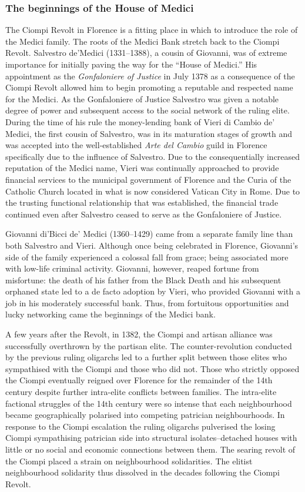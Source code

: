 \subsubsection{The beginnings of the House of Medici}

The Ciompi Revolt in Florence is a fitting place in which to introduce the role of the Medici family. The roots of the Medici Bank stretch back to the Ciompi Revolt. Salvestro de'Medici (1331--1388), a cousin of Giovanni, was of extreme importance for initially paving the way for the ``House of Medici.'' His appointment as the \emph{Gonfaloniere of Justice} in July 1378 as a consequence of the Ciompi Revolt allowed him to begin promoting a reputable and respected name for the Medici. As the Gonfaloniere of Justice Salvestro was given a notable degree of power and subsequent access to the social network of the ruling elite. During the time of his rule the money-lending bank of Vieri di Cambio de' Medici, the first cousin of Salvestro, was in its maturation stages of growth and was accepted into the well-established \emph{Arte del Cambio} guild in Florence specifically due to the influence of Salvestro. Due to the consequentially increased reputation of the Medici name, Vieri was continually approached to provide financial services to the municipal government of Florence and the Curia of the Catholic Church located in what is now considered Vatican City in Rome. Due to the trusting functional relationship that was established, the financial trade continued even after Salvestro ceased to serve as the Gonfaloniere of Justice.

Giovanni di'Bicci de' Medici (1360--1429) came from a separate family line than both Salvestro and Vieri. Although once being celebrated in Florence, Giovanni's side of the family experienced a colossal fall from grace; being associated more with low-life criminal activity. Giovanni, however, reaped fortune from misfortune: the death of his father from the Black Death and his subsequent orphaned state led to a de facto adoption by Vieri, who provided Giovanni with a job in his moderately successful bank. Thus, from fortuitous opportunities and lucky networking came the beginnings of the Medici bank.

A few years after the Revolt, in 1382, the Ciompi and artisan alliance was successfully overthrown by the partisan elite. The counter-revolution conducted by the previous ruling oligarchs led to a further split between those elites who sympathised with the Ciompi and those who did not. Those who strictly opposed the Ciompi eventually reigned over Florence for the remainder of the 14th century despite further intra-elite conflicts between families. The intra-elite factional struggles of the 14th century were so intense that each neighbourhood became geographically polarised into competing patrician neighbourhoods. In response to the Ciompi escalation the ruling oligarchs pulverised the losing Ciompi sympathising patrician side into structural isolates--detached houses with little or no social and economic connections between them. The searing revolt of the Ciompi placed a strain on neighbourhood solidarities. The elitist neighbourhood solidarity thus dissolved in the decades following the Ciompi Revolt.

